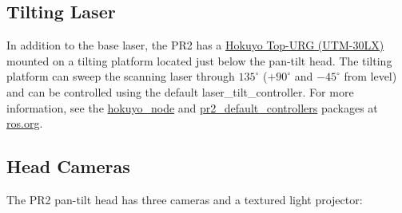 \subsection{Tilting Laser}
\label{tilting laser}
In addition to the base laser, the PR2 has a
\href{http://www.hokuyo-aut.jp/02sensor/07scanner/utm_30lx.html}{Hokuyo Top-URG
  (UTM-30LX)} mounted on a tilting platform located just below the pan-tilt
head. The tilting platform can sweep the scanning laser through $135^\circ$
($+90^\circ$ and $-45^\circ$ from level) and can be controlled using the default
laser\_tilt\_controller. For more information, see the
\href{http://www.ros.org/wiki/hokuyo_node}{hokuyo\_node} and
\href{http://www.ros.org/wiki/pr2_default_controllers}{pr2\_default\_controllers}
packages at \href{http://www.ros.org}{ros.org}.

\subsection{Head Cameras}
The PR2 pan-tilt head has three cameras and a textured light projector:
